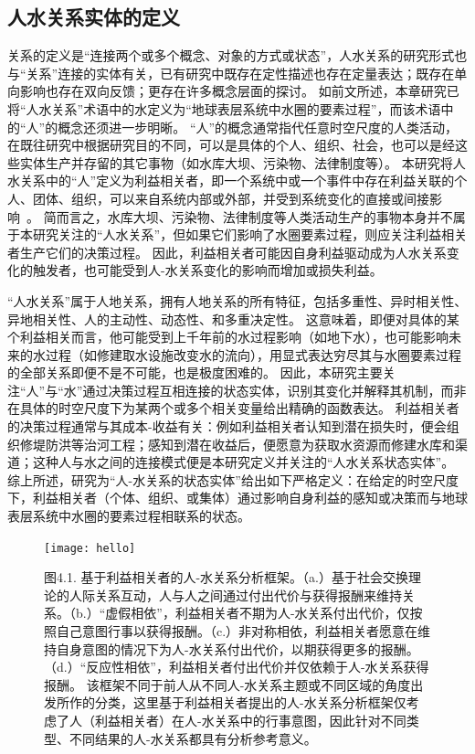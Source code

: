 \subsection{人水关系实体的定义}

关系的定义是“连接两个或多个概念、对象的方式或状态”，人水关系的研究形式也与“关系”连接的实体有关，已有研究中既存在定性描述也存在定量表达；既存在单向影响也存在双向反馈；更存在许多概念层面的探讨。
如前文所述，本章研究已将“人水关系”术语中的水定义为“地球表层系统中水圈的要素过程”，而该术语中的“人”的概念还须进一步明晰。
“人”的概念通常指代任意时空尺度的人类活动，在既往研究中根据研究目的不同，可以是具体的个人、组织、社会，也可以是经这些实体生产并存留的其它事物（如水库大坝、污染物、法律制度等）。
本研究将人水关系中的“人”定义为利益相关者，即一个系统中或一个事件中存在利益关联的个人、团体、组织，可以来自系统内部或外部，并受到系统变化的直接或间接影响~\cite{bonnafous-boucher2016}。
简而言之，水库大坝、污染物、法律制度等人类活动生产的事物本身并不属于本研究关注的“人水关系”，但如果它们影响了水圈要素过程，则应关注利益相关者生产它们的决策过程。
因此，利益相关者可能因自身利益驱动成为人水关系变化的触发者，也可能受到人-水关系变化的影响而增加或损失利益。

“人水关系”属于人地关系，拥有人地关系的所有特征，包括多重性、异时相关性、异地相关性、人的主动性、动态性、和多重决定性\cite{fang2004}。
这意味着，即便对具体的某个利益相关而言，他可能受到上千年前的水过程影响（如地下水），也可能影响未来的水过程（如修建取水设施改变水的流向），用显式表达穷尽其与水圈要素过程的全部关系即便不是不可能，也是极度困难的。
因此，本研究主要关注“人”与“水”通过决策过程互相连接的状态实体，识别其变化并解释其机制，而非在具体的时空尺度下为某两个或多个相关变量给出精确的函数表达。
利益相关者的决策过程通常与其成本-收益有关：例如利益相关者认知到潜在损失时，便会组织修堤防洪等治河工程；感知到潜在收益后，便愿意为获取水资源而修建水库和渠道；这种人与水之间的连接模式便是本研究定义并关注的“人水关系状态实体”。
综上所述，研究为“人-水关系的状态实体”给出如下严格定义：在给定的时空尺度下，利益相关者（个体、组织、或集体）通过影响自身利益的感知或决策而与地球表层系统中水圈的要素过程相联系的状态。

\begin{figure}[htb] %
    \centering
    \texttt{[image: hello]}
    \caption[基于利益相关者的人-水关系分析框架]{图4.1. 基于利益相关者的人-水关系分析框架。（a.）基于社会交换理论的人际关系互动，人与人之间通过付出代价与获得报酬来维持关系。（b.）“虚假相依”，利益相关者不期为人-水关系付出代价，仅按照自己意图行事以获得报酬。（c.）非对称相依，利益相关者愿意在维持自身意图的情况下为人-水关系付出代价，以期获得更多的报酬。（d.）“反应性相依”，利益相关者付出代价并仅依赖于人-水关系获得报酬。
    该框架不同于前人从不同人-水关系主题或不同区域的角度出发所作的分类，这里基于利益相关者提出的人-水关系分析框架仅考虑了人（利益相关者）在人-水关系中的行事意图，因此针对不同类型、不同结果的人-水关系都具有分析参考意义。}\label{ch2:fig:reaction}
\end{figure}

